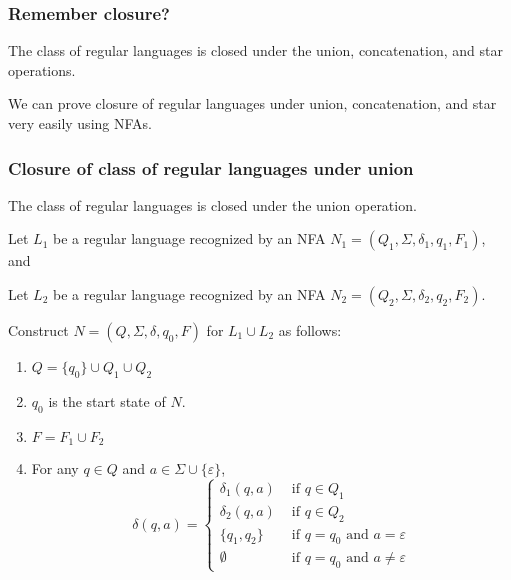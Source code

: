 \documentclass[xcolor=table]{beamer}
\begin{document}
\begin{frame}
  \frametitle{Remember closure?}

  \begin{Theorem}
    The class of regular
    languages is closed under the union, concatenation, and star
    operations.
  \end{Theorem}


  \bigskip
  We can prove closure of regular languages under union,
  concatenation, and star very easily using \alert{NFAs}.
   
\end{frame}

\begin{frame}
  \frametitle{Closure of class of regular languages under union}

  \begin{Theorem}
    The class of regular languages is closed under the union
    operation.
  \end{Theorem}

  \begin{tiny}
  \begin{Proof}
    Let $L_1$ be a regular language recognized by an NFA $N_1 = (Q_1,\Sigma, \delta_1, q_1, F_1)$, and

    Let $L_2$ be a regular language recognized by an NFA $N_2 = (Q_2,\Sigma, \delta_2, q_2, F_2)$.

    Construct $N= (Q,\Sigma, \delta, q_0,F)$ for $L_1 \cup L_2$ as follows:
    \begin{enumerate}
      \item $Q = \{q_0\} \cup Q_1 \cup Q_2$ 
      \item $q_0$ is the start state of $N$.
      \item $F = F_1 \cup F_2$ 
      \item For any $q \in Q$ and $a \in \Sigma\cup \{\varepsilon\}$,
        \[ \delta(q,a) = 
        \begin{cases} 
          \delta_1(q,a) & \text{ if } q \in Q_1 \\
          \delta_2(q,a) & \text{ if } q \in Q_2 \\
          \{ q_1, q_2 \} & \text{ if } q =q_0 \text{ and } a = \varepsilon \\
          \emptyset & \text{ if } q =q_0 \text{ and } a \neq \varepsilon 
        \end{cases} 
        \]
    \end{enumerate}

  \end{Proof}
  \end{tiny}%
\end{frame}
\end{document}
